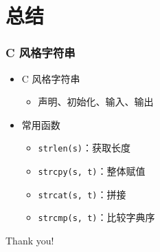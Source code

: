 \section{总结}

\begin{frame}[fragile]
    \frametitle{C 风格字符串}

    \begin{itemize}
        \item<1-> C 风格字符串
        
            \begin{itemize}
                \item 声明、初始化、输入、输出
            \end{itemize}

        \item<2-> 常用函数
        
            \begin{itemize}
                \item \lstinline|strlen(s)|：获取长度
                \item \lstinline|strcpy(s, t)|：整体赋值
                \item \lstinline|strcat(s, t)|：拼接
                \item \lstinline|strcmp(s, t)|：比较字典序
            \end{itemize}
       
    \end{itemize}
\end{frame}

\begin{frame}
    \begin{center}
        {\Huge Thank you!}
    \end{center}
\end{frame}


